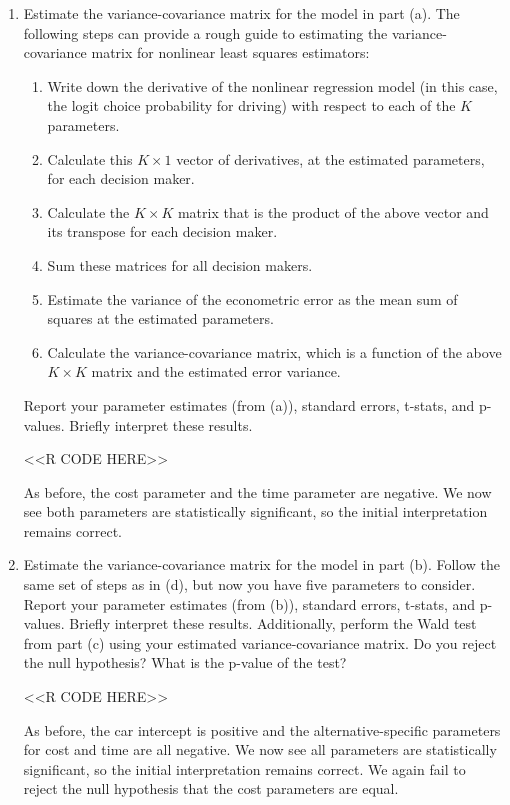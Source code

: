 \documentclass[11pt,letterpaper]{article}
\begin{document}
\begin{enumerate}[label=\alph*., leftmargin=*]
	\item Estimate the variance-covariance matrix for the model in part (a). The following steps can provide a rough guide to estimating the variance-covariance matrix for nonlinear least squares estimators:
	\begin{enumerate}[label=\Roman*.]
		\item Write down the derivative of the nonlinear regression model (in this case, the logit choice probability for driving) with respect to each of the $K$ parameters.
		\item Calculate this $K \times 1$ vector of derivatives, at the estimated parameters, for each decision maker.
		\item Calculate the $K \times K$ matrix that is the product of the above vector and its transpose for each decision maker.
		\item Sum these matrices for all decision makers.
		\item Estimate the variance of the econometric error as the mean sum of squares at the estimated parameters.
		\item Calculate the variance-covariance matrix, which is a function of the above $K \times K$ matrix and the estimated error variance.
	\end{enumerate}
	Report your parameter estimates (from (a)), standard errors, t-stats, and p-values. Briefly interpret these results.

	<<R CODE HERE>>

	As before, the cost parameter and the time parameter are negative. We now see both parameters are statistically significant, so the initial interpretation remains correct.

	\item Estimate the variance-covariance matrix for the model in part (b). Follow the same set of steps as in (d), but now you have five parameters to consider. Report your parameter estimates (from (b)), standard errors, t-stats, and p-values. Briefly interpret these results. Additionally, perform the Wald test from part (c) using your estimated variance-covariance matrix. Do you reject the null hypothesis? What is the p-value of the test?

	<<R CODE HERE>>

	As before, the car intercept is positive and the alternative-specific parameters for cost and time are all negative. We now see all parameters are statistically significant, so the initial interpretation remains correct. We again fail to reject the null hypothesis that the cost parameters are equal.
\end{enumerate}
\end{document}

